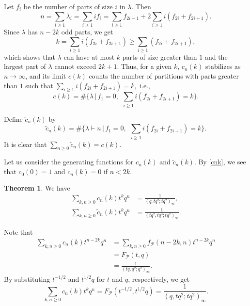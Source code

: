 \documentclass[reqno]{amsart}
\theoremstyle{definition}
\newtheorem{thm}{Theorem}%
\newcommand{\pa}{\mathcal{P}}
\newcommand{\tc}{\tilde{c}}
\begin{document}
Let $f_i$ be the number of parts of size $i$ in $\lambda$. Then
\begin{equation*}
n=\sum_{i\ge 1}\lambda_i=\sum_{i\ge 1}  i  f_i= \sum_{i\ge 1} f_{2i-1} + 2\sum_{i\ge 1} i (f_{2i}+f_{2i+1}) . 
\end{equation*}
Since  $\lambda$ has $n-2k$ odd parts,  we get 
\begin{equation*}
k=\sum_{i\ge 1} i(f_{2i}+f_{2i+1}) \ge \sum_{i\ge 1} (f_{2i}+f_{2i+1}),
\end{equation*}
which shows that  $\lambda$ can have at most $k$ parts of size greater than $1$ and the largest part of $\lambda$ cannot exceed $2k+1$.  Thus, for a given $k$, $c_n(k)$ stabilizes  as $n\to \infty$, and its limit $c(k)$ counts the number of partitions with parts greater than $1$ such that  $\sum_{i\ge 1} i(f_{2i}+f_{2i+1})=k,$ i.e.,
\begin{equation*}
c(k)=\# \{\lambda \,|\, f_1=0, \;\,  \sum_{i\ge 1} i(f_{2i}+f_{2i+1})= k\}.
\end{equation*}

Define $\tc_n(k)$ by 
\begin{equation}
\tc_n(k) = \# \{\lambda \vdash n\,|\, f_1=0,\;\, \sum_{i\ge 1} i(f_{2i}+f_{2i+1})=k \}. \label{cntilde}
\end{equation}
It is clear that $\sum_{n \ge 0} \tc_n(k) = c(k)$.


Let us consider the generating functions for $c_n(k)$ and $\tc_n(k)$.  By \eqref{cnk}, we see that $c_0(0)=1$ and $c_n(k)=0$ if $n<2k$. 

\begin{thm} \label{thm:cnk}
We have
\begin{align*}
\sum_{ k,n\ge 0}  c_{n}(k) t^{k}q^{n}&=\frac{1}{(q,tq^2;tq^2)_{\infty}},\\
\sum_{ k,n\ge 0} \tc_n(k)  t^{k} q^{n} &=\frac{1}{(tq^2,tq^3;tq^2)_{\infty}}.
\end{align*}
\end{thm}
\proof
Note that 
\begin{align*}
\sum_{ k,n\ge 0} c_n(k) t^{n-2k}q^n &= \sum_{ k,n\ge 0} f_{\pa}(n-2k,n) t^{n-2k}q^n\\
& =F_{\pa}(t,q)  \\
&= \frac{1}{(tq,q^2;q^2)_{\infty}}.
\end{align*}
By substituting $t^{-1/2}$ and $t^{1/2}q$ for $t$ and $q$, respectively,  we get
$$
\sum_{ k,n\ge 0} c_n(k) t^{k} q^n 
= F_{\pa}(t^{-1/2},t^{1/2}q)
=\frac{1}{(q,tq^2;tq^2)_{\infty}}.
$$
\end{document}
